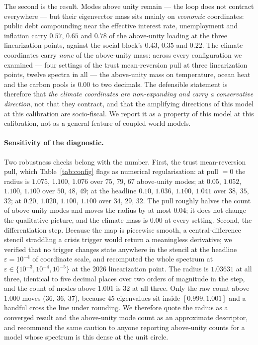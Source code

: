 \documentclass[12pt,a4paper]{article}
\newcommand{\rhoA}{1.036} \newcommand{\rhoB}{1.100} \newcommand{\rhoC}{1.041}
\begin{document}
The second is the result. Modes above unity remain --- the loop does not contract everywhere
--- but their eigenvector mass sits mainly on \emph{economic} coordinates: public debt
compounding near the effective interest rate, unemployment and inflation carry $0.57$, $0.65$
and $0.78$ of the above-unity loading at the three linearization points, against the social
block's $0.43$, $0.35$ and $0.22$. The climate coordinates carry \emph{none} of the
above-unity mass: across every configuration we examined --- four settings of the trust
mean-reversion pull at three linearization points, twelve spectra in all --- the above-unity
mass on temperature, ocean heat and the carbon pools is $0.00$ to two decimals. The defensible
statement is therefore that \emph{the climate coordinates are non-expanding and carry a
conservative direction}, not that they contract, and that the amplifying directions of this
model at this calibration are socio-fiscal. We report it as a property of this model at this
calibration, not as a general feature of coupled world models.

\paragraph{Sensitivity of the diagnostic.} Two robustness checks belong with the number.
First, the trust mean-reversion pull, which Table~\ref{tab:config} flags as numerical
regularisation: at pull $=0$ the radius is $1.075$, $1.100$, $1.076$ over $75$, $79$, $67$
above-unity modes; at $0.05$, $1.052$, $1.100$, $1.100$ over $50$, $48$, $49$; at the headline
$0.10$, $\rhoA$, $\rhoB$, $\rhoC$ over $38$, $35$, $32$; at $0.20$, $1.020$, $1.100$, $1.100$
over $34$, $29$, $32$. The pull roughly halves the count of above-unity modes and moves the
radius by at most $0.04$; it does not change the qualitative picture, and the climate mass is
$0.00$ at every setting. Second, the differentiation step. Because the map is piecewise
smooth, a central-difference stencil straddling a crisis trigger would return a meaningless
derivative; we verified that no trigger changes state anywhere in the stencil at the headline
$\varepsilon=10^{-4}$ of coordinate scale, and recomputed the whole spectrum at
$\varepsilon\in\{10^{-3},10^{-4},10^{-5}\}$ at the 2026 linearization point. The radius is
$1.03631$ at all three, identical to five decimal places over two orders of magnitude in the
step, and the count of modes above $1.001$ is $32$ at all three. Only the raw count above
$1.000$ moves ($36$, $36$, $37$), because $45$ eigenvalues sit inside $[0.999,1.001]$ and a
handful cross the line under rounding. We therefore quote the radius as a converged result and
the above-unity mode count as an approximate descriptor, and recommend the same caution to
anyone reporting above-unity counts for a model whose spectrum is this dense at the unit
circle.
\end{document}
